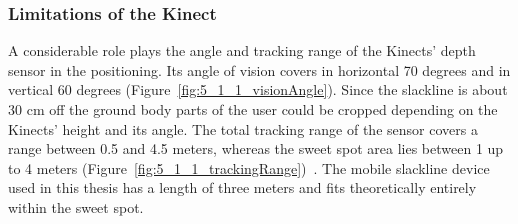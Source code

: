 \subsubsection{Limitations of the Kinect} 
A considerable role plays the angle and tracking range of the Kinects' depth sensor in the positioning. Its angle of vision covers in horizontal 70 degrees and in vertical 60 degrees (Figure~\ref{fig:5_1_1_visionAngle}). Since the slackline is about 30 cm off the ground body parts of the user could be cropped depending on the Kinects' height and its angle. The total tracking range of the sensor covers a range between 0.5 and 4.5 meters, whereas the sweet spot area lies between 1 up to 4 meters (Figure~\ref{fig:5_1_1_trackingRange})~\cite{MicrosoftHIG2014-mh}. The mobile slackline device used in this thesis has a length of three meters and fits theoretically entirely within the sweet spot.
